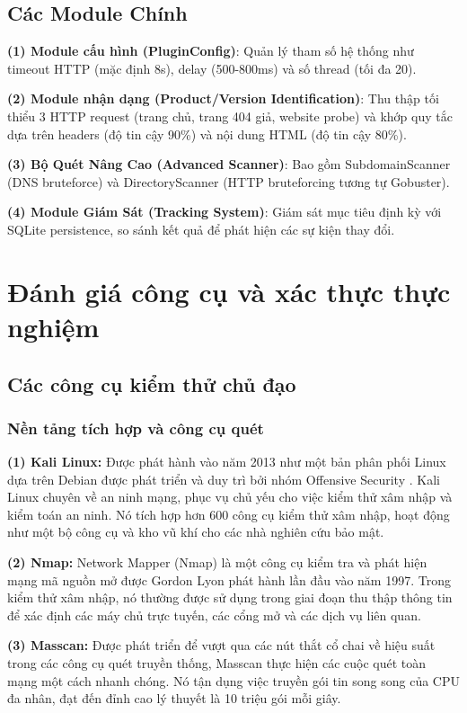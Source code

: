 \documentclass[conference]{IEEEtran}
\begin{document}
\subsection{Các Module Chính}
\textbf{(1) Module cấu hình (PluginConfig)}: Quản lý tham số hệ thống như timeout HTTP (mặc định 8s), delay (500-800ms) và số thread (tối đa 20).

\textbf{(2) Module nhận dạng (Product/Version Identification)}: Thu thập tối thiểu 3 HTTP request (trang chủ, trang 404 giả, website probe) và khớp quy tắc dựa trên headers (độ tin cậy 90\%) và nội dung HTML (độ tin cậy 80\%).

\textbf{(3) Bộ Quét Nâng Cao (Advanced Scanner)}: Bao gồm SubdomainScanner (DNS bruteforce) và DirectoryScanner (HTTP bruteforcing tương tự Gobuster).

\textbf{(4) Module Giám Sát (Tracking System)}: Giám sát mục tiêu định kỳ với SQLite persistence, so sánh kết quả để phát hiện các sự kiện thay đổi.

\section{Đánh giá công cụ và xác thực thực nghiệm}
\subsection{Các công cụ kiểm thử chủ đạo}
\subsubsection{Nền tảng tích hợp và công cụ quét}

\textbf{(1) Kali Linux:} Được phát hành vào năm 2013 như một bản phân phối Linux dựa trên Debian được phát triển và duy trì bởi nhóm Offensive Security \cite{ref10}. Kali Linux chuyên về an ninh mạng, phục vụ chủ yếu cho việc kiểm thử xâm nhập và kiểm toán an ninh. Nó tích hợp hơn 600 công cụ kiểm thử xâm nhập, hoạt động như một bộ công cụ và kho vũ khí cho các nhà nghiên cứu bảo mật.

\textbf{(2) Nmap:} Network Mapper (Nmap) là một công cụ kiểm tra và phát hiện mạng mã nguồn mở được Gordon Lyon phát hành lần đầu vào năm 1997. Trong kiểm thử xâm nhập, nó thường được sử dụng trong giai đoạn thu thập thông tin để xác định các máy chủ trực tuyến, các cổng mở và các dịch vụ liên quan.

\textbf{(3) Masscan:} Được phát triển để vượt qua các nút thắt cổ chai về hiệu suất trong các công cụ quét truyền thống, Masscan thực hiện các cuộc quét toàn mạng một cách nhanh chóng. Nó tận dụng việc truyền gói tin song song của CPU đa nhân, đạt đến đỉnh cao lý thuyết là 10 triệu gói mỗi giây.
\end{document}
